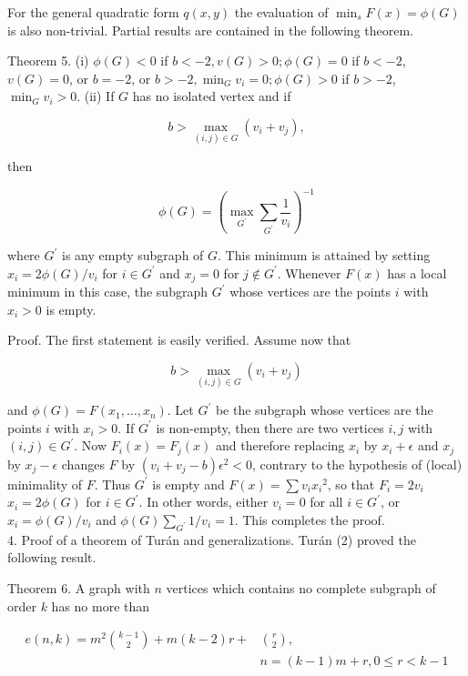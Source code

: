 \documentclass[10pt]{article}
\begin{document}
For the general quadratic form \(q(x, y)\) the evaluation of \(\min _{s} F(x)=\phi(G)\) is also non-trivial. Partial results are contained in the following theorem.

Theorem 5. (i) \(\phi(G)<0\) if \(b<-2, v(G)>0 ; \phi(G)=0\) if \(b<-2\), \(v(G)=0\), or \(b=-2\), or \(b>-2, \min _{G} v_{i}=0 ; \phi(G)>0\) if \(b>-2\), \(\min _{G} v_{i}>0\). (ii) If \(G\) has no isolated vertex and if

\[
b>\max _{(i, j) \in G}\left(v_{i}+v_{j}\right),
\]

then

\[
\phi(G)=\left(\max _{G^{\prime}} \sum_{G^{\prime}} \frac{1}{v_{i}}\right)^{-1}
\]

where \(G^{\prime}\) is any empty subgraph of \(G\). This minimum is attained by setting \(x_{i}=2 \phi(G) / v_{i}\) for \(i \in G^{\prime}\) and \(x_{j}=0\) for \(j \notin G^{\prime}\). Whenever \(F(x)\) has a local minimum in this case, the subgraph \(G^{\prime}\) whose vertices are the points \(i\) with \(x_{i}>0\) is empty.

Proof. The first statement is easily verified. Assume now that

\[
b>\max _{(i, j) \in G}\left(v_{i}+v_{j}\right)
\]

and \(\phi(G)=F\left(x_{1}, \ldots, x_{n}\right)\). Let \(G^{\prime}\) be the subgraph whose vertices are the points \(i\) with \(x_{i}>0\). If \(G^{\prime}\) is non-empty, then there are two vertices \(i, j\) with \((i, j) \in G^{\prime}\). Now \(F_{i}(x)=F_{j}(x)\) and therefore replacing \(x_{i}\) by \(x_{i}+\epsilon\) and \(x_{j}\) by \(x_{j}-\epsilon\) changes \(F\) by \(\left(v_{i}+v_{j}-b\right) \epsilon^{2}<0\), contrary to the hypothesis of (local) minimality of \(F\). Thus \(G^{\prime}\) is empty and \(F(x)=\sum v_{i} x_{i}{ }^{2}\), so that \(F_{i}=2 v_{i}\) \(x_{i}=2 \phi(G)\) for \(i \in G^{\prime}\). In other words, either \(v_{i}=0\) for all \(i \in G^{\prime}\), or \(x_{i}=\phi(G) / v_{i}\) and \(\phi(G) \sum_{G^{\prime}} 1 / v_{i}=1\). This completes the proof.\\
4. Proof of a theorem of Turán and generalizations. Turán (2) proved the following result.

Theorem 6. A graph with \(n\) vertices which contains no complete subgraph of order \(k\) has no more than

\[
\begin{aligned}
e(n, k)=m^{2}\binom{k-1}{2}+m(k-2) r+ & \binom{r}{2}, \\
& n=(k-1) m+r, 0 \leqslant r<k-1
\end{aligned}
\]
\end{document}
